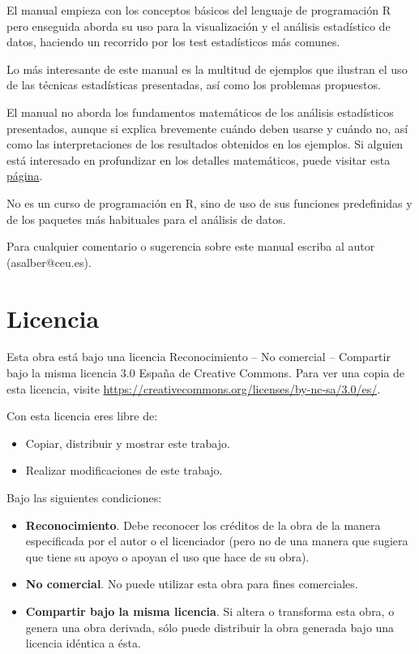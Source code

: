 \documentclass[
  spanish,
  a4paper,
]{scrreport}
\providecommand{\tightlist}{%
  \setlength{\itemsep}{0pt}\setlength{\parskip}{0pt}}
\theoremstyle{definition}
\theoremstyle{definition}
\theoremstyle{remark}
\begin{document}
El manual empieza con los conceptos básicos del lenguaje de programación
R pero enseguida aborda su uso para la visualización y el análisis
estadístico de datos, haciendo un recorrido por los test estadísticos
más comunes.

Lo más interesante de este manual es la multitud de ejemplos que
ilustran el uso de las técnicas estadísticas presentadas, así como los
problemas propuestos.

El manual no aborda los fundamentos matemáticos de los análisis
estadísticos presentados, aunque si explica brevemente cuándo deben
usarse y cuándo no, así como las interpretaciones de los resultados
obtenidos en los ejemplos. Si alguien está interesado en profundizar en
los detalles matemáticos, puede visitar esta
\href{https://aprendeconalf.es/docencia/estadistica/}{página}.

No es un curso de programación en R, sino de uso de sus funciones
predefinidas y de los paquetes más habituales para el análisis de datos.

Para cualquier comentario o sugerencia sobre este manual escriba al
autor (asalber@ceu.es).

\section*{Licencia}\label{licencia}


Esta obra está bajo una licencia Reconocimiento -- No comercial --
Compartir bajo la misma licencia 3.0 España de Creative Commons. Para
ver una copia de esta licencia, visite
\url{https://creativecommons.org/licenses/by-nc-sa/3.0/es/}.

Con esta licencia eres libre de:

\begin{itemize}
\tightlist
\item
  Copiar, distribuir y mostrar este trabajo.
\item
  Realizar modificaciones de este trabajo.
\end{itemize}

Bajo las siguientes condiciones:

\begin{itemize}
\item
  \textbf{Reconocimiento}. Debe reconocer los créditos de la obra de la
  manera especificada por el autor o el licenciador (pero no de una
  manera que sugiera que tiene su apoyo o apoyan el uso que hace de su
  obra).
\item
  \textbf{No comercial}. No puede utilizar esta obra para fines
  comerciales.
\item
  \textbf{Compartir bajo la misma licencia}. Si altera o transforma esta
  obra, o genera una obra derivada, sólo puede distribuir la obra
  generada bajo una licencia idéntica a ésta.
\end{itemize}
\end{document}
